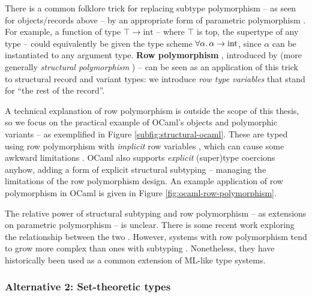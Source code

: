 There is a common folklore trick for replacing subtype polymorphism -- as seen for objects/records above -- by an appropriate form of parametric polymorphism \cite{structural-subtyping-as-parameric-polymorphism}. For example, a function of type $\top \to \mathrm{int}$ -- where $\top$ is top, the supertype of any type -- could equivalently be given the type scheme $\forall \alpha \ldotp \alpha \to \mathrm{int}$, since $\alpha$ can be instantiated to any argument type.
\textbf{Row polymorphism} \cite{remy-records}, introduced by \textcite{wand-rows} (more generally \emph{structural polymorphism} \cite{simple-structural-polymorphism}) -- can be seen as an application of this trick to structural record and variant types: we introduce \emph{row type variables} that stand for \enquote{the rest of the record}.

A technical explanation of row polymorphism is outside the scope of this thesis, so we focus on the practical example of OCaml's objects \cite{objective-ml} and polymorphic variants \cite{polymorphic-variants} -- as exemplified in Figure \ref{subfig:structural-ocaml}. These are typed using row polymorphism with \emph{implicit} row variables \cite{objective-ml}, which can cause some awkward limitations \cite{castagna-polymorphic-variants}. OCaml also supports \emph{explicit} (super)type coercions anyhow, adding a form of explicit structural subtyping -- managing the limitations of the row polymorphism design. 
An example application of row polymorphism in OCaml is given in Figure \ref{fig:ocaml-row-polymorphism}.

The relative power of structural subtyping and row polymorphism -- as extensions on parametric polymorphism -- is unclear.
There is some recent work exploring the relationship between the two \cite{disjoint-polymorphism, structural-subtyping-as-parameric-polymorphism}. However, systems with row polymorphism tend to grow more complex than ones with subtyping \cite{castagna-polymorphic-variants}. Nonetheless, they have historically been used as a common extension of ML-like type systems.

\subsubsection{Alternative 2: Set-theoretic types}

